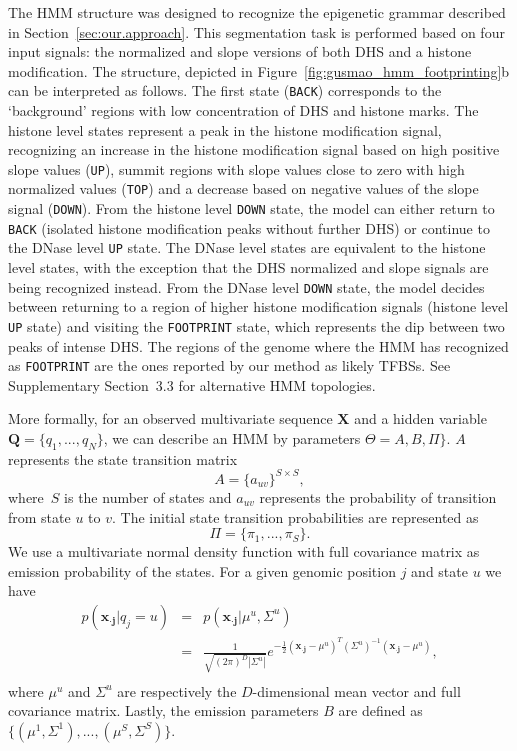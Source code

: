 The HMM structure was designed to recognize the epigenetic grammar
described in Section~\ref{sec:our.approach}. This segmentation task is
performed based on four input signals: the normalized and slope versions
of both DHS and a histone modification. The structure,
depicted in Figure~\ref{fig:gusmao_hmm_footprinting}b can be interpreted as follows.
The first state ({\tt BACK}) corresponds to the `background' regions
with low concentration of DHS and histone marks. The
histone level states represent a peak in the histone modification signal,
recognizing an increase in the histone modification signal based on high positive
slope values ({\tt UP}), summit regions with slope
values close to zero with high normalized values ({\tt TOP}) and a
decrease based on negative values of the slope signal ({\tt DOWN}).
From the histone level {\tt DOWN} state, the model can either return
to {\tt BACK} (isolated histone modification peaks without further DHS) or continue
to the DNase level {\tt UP} state. The DNase
level states are equivalent to the histone level states, with the
exception that the DHS normalized and slope signals are being
recognized instead. From the DNase level {\tt DOWN} state, the model
decides between returning to a region of higher histone
modification signals (histone level {\tt UP} state) and visiting the
{\tt FOOTPRINT} state, which represents the dip between two peaks of
intense DHS. The regions of the genome where the HMM has
recognized as {\tt FOOTPRINT} are the ones reported by our method as
likely TFBSs. See Supplementary Section~3.3 for alternative HMM topologies.

More formally, for an observed multivariate sequence $\mathbf{X}$ and
a hidden variable $\mathbf{Q}=\{q_1,...,q_N\}$, we can describe an HMM
by parameters $\Theta= A,B,\Pi\}$. $A$ represents the state
transition matrix
\begin{equation}
    A = {\{a_{uv}\}}^{S \times S},
\end{equation}
where~$S$ is the number of states and $a_{uv}$ represents the
probability of transition from state $u$ to $v$. The initial state
transition probabilities are represented as
\begin{equation}
    \Pi = \{\pi_{1},...,\pi_{S}\}.
\end{equation}
We use a multivariate normal density function with full covariance matrix as emission probability
of the states. For a given genomic position $j$ and state $u$ we have
\begin{equation}
    \begin{array}{lcl}
p(\mathbf{x_{\cdot j}}|q_j=u) & = & p(\mathbf{x_{\cdot j}}|{{\mu}^{u}},{{\Sigma}^{u}})\\[0.4em]
                          & = &
\frac{1}{ \sqrt{(2\pi)^{D} {| {{{\Sigma}^{u}}} |}}}
e^{-\frac{1}{2} (\mathbf{x_{\cdot j}}-\mu^u)^T (\Sigma^u)^{-1} (\mathbf{x_{\cdot j}}-\mu^u)}, \\
    \end{array}
    \label{eq:gaussian}
\end{equation}
where $\mu^u$ and $\Sigma^u$ are respectively the $D$-dimensional
mean vector and full covariance matrix. Lastly, the emission parameters $B$ are
defined as $\{(\mu^1,\Sigma^1),...,(\mu^S,\Sigma^S)\}$.

